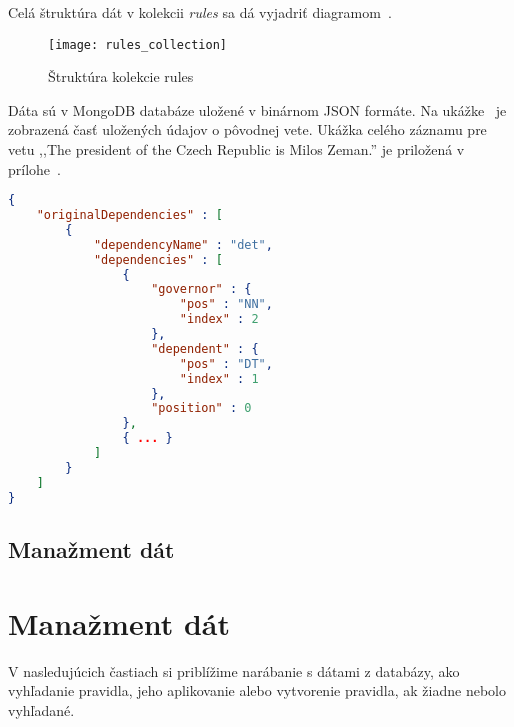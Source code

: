 Celá štruktúra dát v kolekcii \textit{rules} sa dá vyjadriť diagramom~.

\begin{figure}[H]
	\begin{center}\texttt{[image: rules\_collection]}\end{center}
	\caption[Štruktúra kolekcie rules]{Štruktúra kolekcie rules}\label{fig:rules_collection_structure}
\end{figure}

Dáta sú v MongoDB databáze uložené v binárnom JSON formáte. Na ukážke~ je zobrazená časť uložených údajov o pôvodnej vete. Ukážka celého záznamu pre vetu ,,The president of the Czech Republic is Milos Zeman.'' je priložená v prílohe~.
\\
\begin{lstlisting}[language = json, caption={Ukážka dát kolekcie rules}, label = {code:collection_rules_data_example}]
{  
	"originalDependencies" : [  
		{  
			"dependencyName" : "det",
			"dependencies" : [  
				{  
					"governor" : {  
						"pos" : "NN",
						"index" : 2
					},
					"dependent" : {  
						"pos" : "DT",
						"index" : 1
					},
					"position" : 0
				},
				{ ... }
			]
		}
	]
}
\end{lstlisting}


%
%
{
	\subsection{Manažment dát}
}
{
	\section{Manažment dát}
}
\label{subsection:data_management}
V nasledujúcich častiach si priblížime narábanie s dátami z databázy, ako vyhľadanie pravidla, jeho aplikovanie alebo vytvorenie pravidla, ak žiadne nebolo vyhľadané.

